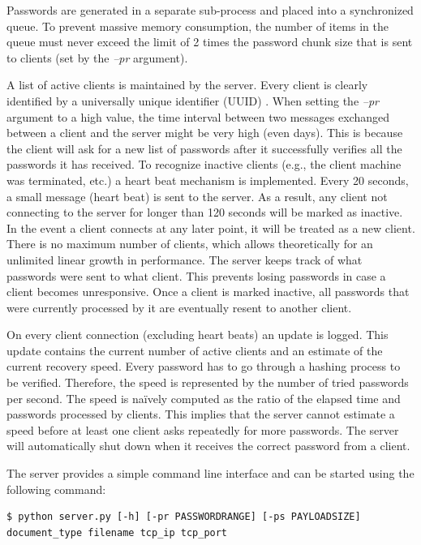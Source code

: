 \documentclass[11pt,oneside]{fithesis2}
\begin{document}
Passwords are generated in a separate sub-process and placed into a synchronized queue. To prevent massive memory consumption, the number of items in the queue must never exceed the limit of 2 times the password chunk size that is sent to clients (set by the \textit{–pr} argument).

A list of active clients is maintained by the server. Every client is clearly identified by a universally unique identifier (UUID) \cite{rfc4122}. When setting the \textit{–pr} argument to a high value, the time interval between two messages exchanged between a client and the server might be very high (even days). This is because the client will ask for a new list of passwords after it successfully verifies all the passwords it has received. To recognize inactive clients (e.g., the client machine was terminated, etc.) a heart beat mechanism is implemented. Every 20 seconds, a small message (heart beat) is sent to the server. As a result, any client not connecting to the server for longer than 120 seconds will be marked as inactive. In the event a client connects at any later point, it will be treated as a new client. There is no maximum number of clients, which allows theoretically for an unlimited linear growth in performance. The server keeps track of what passwords were sent to what client. This prevents losing passwords in case a client becomes unresponsive. Once a client is marked inactive, all passwords that were currently processed by it are eventually resent to another client. 

On every client connection (excluding heart beats) an update is logged. This update contains the current number of active clients and an estimate of the current recovery speed. Every password has to go through a hashing process to be verified. Therefore, the speed is represented by the number of tried passwords per second. The speed is naïvely computed as the ratio of the elapsed time and passwords processed by clients. This implies that the server cannot estimate a speed before at least one client asks repeatedly for more passwords. The server will automatically shut down when it receives the correct password from a client.

The server provides a simple command line interface and can be started using the following command: 

\begin{lstlisting}
$ python server.py [-h] [-pr PASSWORDRANGE] [-ps PAYLOADSIZE] document_type filename tcp_ip tcp_port
\end{lstlisting}
\end{document}
